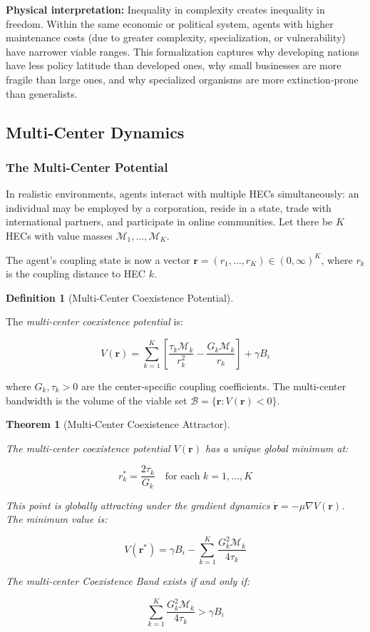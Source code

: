 \documentclass[11pt]{article}
\theoremstyle{plain}
\newtheorem{theorem}{Theorem}
\theoremstyle{definition}
\newtheorem{definition}{Definition}
\theoremstyle{remark}
\let\origsubsection\subsection
\renewcommand{\subsection}{\needspace{7\baselineskip}\origsubsection}
\let\origsubsubsection\subsubsection
\renewcommand{\subsubsection}{\needspace{4\baselineskip}\origsubsubsection}
\begin{document}
\textbf{Physical interpretation:} Inequality in complexity creates
inequality in freedom. Within the same economic or political system,
agents with higher maintenance costs (due to greater complexity,
specialization, or vulnerability) have narrower viable ranges. This
formalization captures why developing nations have less policy latitude
than developed ones, why small businesses are more fragile than large
ones, and why specialized organisms are more extinction-prone than
generalists.

\subsection{Multi-Center Dynamics}\label{multi-center-dynamics}

\subsubsection{The Multi-Center
Potential}\label{the-multi-center-potential}

In realistic environments, agents interact with multiple HECs
simultaneously: an individual may be employed by a corporation, reside
in a state, trade with international partners, and participate in online
communities. Let there be \(K\) HECs with value masses
\(\mathcal{M}_1, \ldots, \mathcal{M}_K\).

The agent's coupling state is now a vector
\(\mathbf{r} = (r_1, \ldots, r_K) \in (0, \infty)^K\), where \(r_k\) is
the coupling distance to HEC \(k\).

\begin{definition}[Multi-Center Coexistence Potential]
\label{def-multi-center-potential}

The \emph{multi-center coexistence potential} is:

$$V(\mathbf{r}) = \sum_{k=1}^{K} \left[\frac{\tau_k \mathcal{M}_k}{r_k^2} - \frac{G_k \mathcal{M}_k}{r_k}\right] + \gamma B_i$$

where $G_k, \tau_k > 0$ are the center-specific coupling coefficients. The multi-center bandwidth is the volume of the viable set $\mathcal{B} = \{\mathbf{r} : V(\mathbf{r}) < 0\}$.
\end{definition}

\begin{theorem}[Multi-Center Coexistence Attractor]
\label{thm-multi-center-attractor}

The multi-center coexistence potential $V(\mathbf{r})$ has a unique global minimum at:

$$r_k^* = \frac{2\tau_k}{G_k} \quad \text{for each } k = 1, \ldots, K$$

This point is globally attracting under the gradient dynamics $\dot{\mathbf{r}} = -\mu \nabla V(\mathbf{r})$. The minimum value is:

$$V(\mathbf{r}^*) = \gamma B_i - \sum_{k=1}^{K} \frac{G_k^2 \mathcal{M}_k}{4\tau_k}$$

The multi-center Coexistence Band exists if and only if:

$$\sum_{k=1}^{K} \frac{G_k^2 \mathcal{M}_k}{4\tau_k} > \gamma B_i$$
\end{theorem}
\end{document}

